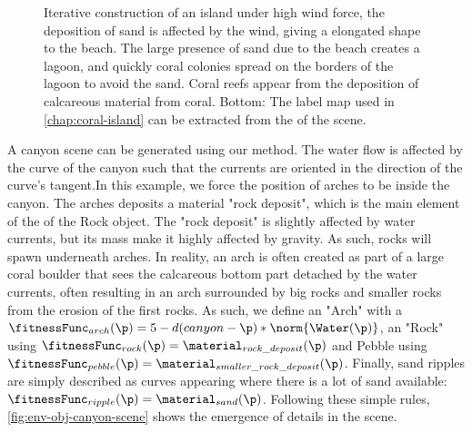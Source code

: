 \begin{figure}

    \caption{Iterative construction of an island under high wind force, the deposition of sand is affected by the wind, giving a elongated shape to the beach. The large presence of sand due to the beach creates a lagoon, and quickly coral colonies spread on the borders of the lagoon to avoid the sand. Coral reefs appear from the deposition of calcareous material from coral. Bottom: The label map used in \cref{chap:coral-island} can be extracted from the  of the scene. }
    \label{fig:env-obj-iterative-island}
\end{figure}

A canyon scene can be generated using our method. The water flow is affected by the curve of the canyon such that the currents are oriented in the direction of the curve's tangent.In this example, we force the position of arches to be inside the canyon. The arches deposits a material "rock deposit", which is the main element of the  of the Rock object. The "rock deposit" is slightly affected by water currents, but its mass make it highly affected by gravity. As such, rocks will spawn underneath arches. In reality, an arch is often created as part of a large coral boulder that sees the calcareous bottom part detached by the water currents, often resulting in an arch surrounded by big rocks and smaller rocks from the erosion of the first rocks.
As such, we define an  "Arch" with a  $\fitnessFunc_{arch}(\p) = 5 - d(canyon - \p) * \norm{\Water(\p)}$, an  "Rock" using $\fitnessFunc_{rock}(\p) = \material_{rock\_deposit}(\p)$ and Pebble using $\fitnessFunc_{pebble}(\p) = \material_{smaller\_rock\_deposit}(\p)$. Finally, sand ripples are simply described as curves appearing where there is a lot of sand available: $\fitnessFunc_{ripple}(\p) = \material_{sand}(\p)$.
Following these simple rules, \cref{fig:env-obj-canyon-scene} shows the emergence of details in the scene. 

